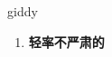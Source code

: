
\begin{frame}
{\huge giddy}
\begin{center}
\begin{enumerate}\Large
  \item \textbf{轻率不严肃的}
\end{enumerate}
\end{center}
\end{frame}
